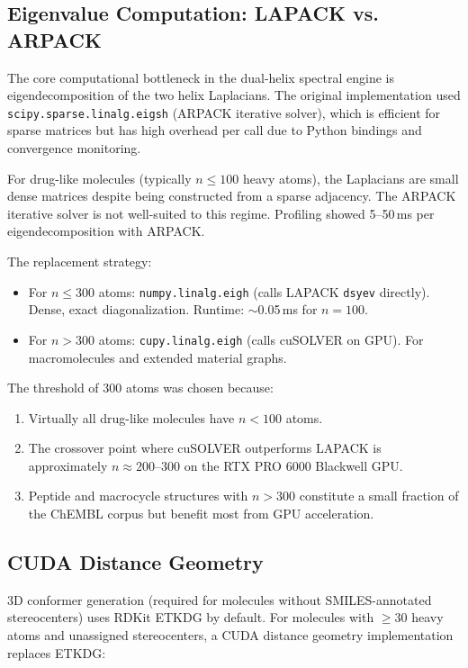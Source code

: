 \documentclass[11pt,a4paper]{article}
\begin{document}
\subsection{Eigenvalue Computation: LAPACK vs. ARPACK}

The core computational bottleneck in the dual-helix spectral engine is
eigendecomposition of the two helix Laplacians. The original implementation
used \texttt{scipy.sparse.linalg.eigsh} (ARPACK iterative solver), which is
efficient for sparse matrices but has high overhead per call due to Python
bindings and convergence monitoring.

For drug-like molecules (typically $n \le 100$ heavy atoms), the Laplacians are
small dense matrices despite being constructed from a sparse adjacency. The
ARPACK iterative solver is not well-suited to this regime. Profiling showed
5--50\,ms per eigendecomposition with ARPACK.

The replacement strategy:

\begin{itemize}[leftmargin=1.5em]
  \item For $n \le 300$ atoms: \texttt{numpy.linalg.eigh} (calls LAPACK \texttt{dsyev}
    directly). Dense, exact diagonalization. Runtime: $\sim$0.05\,ms for $n=100$.
  \item For $n > 300$ atoms: \texttt{cupy.linalg.eigh} (calls cuSOLVER on GPU).
    For macromolecules and extended material graphs.
\end{itemize}

The threshold of 300 atoms was chosen because:
\begin{enumerate}[leftmargin=1.5em]
  \item Virtually all drug-like molecules have $n < 100$ atoms.
  \item The crossover point where cuSOLVER outperforms LAPACK is approximately
    $n \approx 200$--$300$ on the RTX PRO 6000 Blackwell GPU.
  \item Peptide and macrocycle structures with $n > 300$ constitute a small
    fraction of the ChEMBL corpus but benefit most from GPU acceleration.
\end{enumerate}

\subsection{CUDA Distance Geometry}

3D conformer generation (required for molecules without SMILES-annotated
stereocenters) uses RDKit ETKDG by default. For molecules with $\ge 30$ heavy
atoms and unassigned stereocenters, a CUDA distance geometry implementation
replaces ETKDG:
\end{document}

